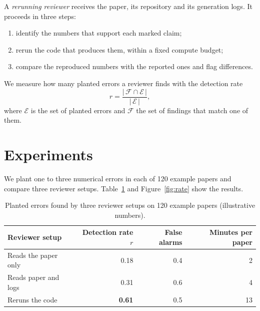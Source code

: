 \documentclass{roar2027}   %
\begin{document}
A \emph{rerunning reviewer} receives the paper, its repository and its generation logs. It
proceeds in three steps:
\begin{enumerate}
  \item identify the numbers that support each marked claim;
  \item rerun the code that produces them, within a fixed compute budget;
  \item compare the reproduced numbers with the reported ones and flag differences.
\end{enumerate}
We measure how many planted errors a reviewer finds with the detection rate
\begin{equation}
  \label{eq:rate}
  r = \frac{|\,\mathcal{F} \cap \mathcal{E}\,|}{|\,\mathcal{E}\,|},
\end{equation}
where $\mathcal{E}$ is the set of planted errors and $\mathcal{F}$ the set of findings that
match one of them.

\section{Experiments}
\label{sec:experiments}

We plant one to three numerical errors in each of 120 example papers and compare three
reviewer setups. Table~\ref{tab:main} and Figure~\ref{fig:rate} show the results.

\begin{table}[t]
  \centering
  \caption{Planted errors found by three reviewer setups on 120 example papers
    (illustrative numbers).}
  \label{tab:main}
  \begin{tabular}{@{}lrrr@{}}
    \toprule
    Reviewer setup & Detection rate $r$ & False alarms & Minutes per paper \\
    \midrule
    Reads the paper only  & 0.18 & 0.4 & 2 \\
    Reads paper and logs  & 0.31 & 0.6 & 4 \\
    Reruns the code       & \textbf{0.61} & 0.5 & 13 \\
    \bottomrule
  \end{tabular}
\end{table}
\end{document}
